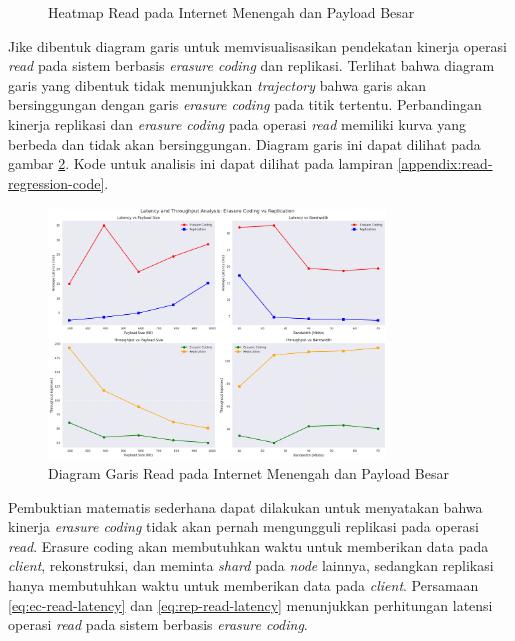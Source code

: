 \begin{enumerate}
\begin{figure}[ht]
    \caption{Heatmap Read pada Internet Menengah dan Payload Besar}
      \label{fig:read-bigload-avgnet-heatmap}
  \end{figure}

  Jike dibentuk diagram garis untuk memvisualisasikan pendekatan kinerja operasi \textit{read} pada sistem berbasis \textit{erasure coding} dan replikasi. Terlihat bahwa diagram garis yang dibentuk tidak menunjukkan \textit{trajectory} bahwa garis akan bersinggungan dengan garis \textit{erasure coding} pada titik tertentu. Perbandingan kinerja replikasi dan \textit{erasure coding} pada operasi \textit{read} memiliki kurva yang berbeda dan tidak akan bersinggungan. Diagram garis ini dapat dilihat pada gambar \ref{fig:read-bigload-avgnet-line}. Kode untuk analisis ini dapat dilihat pada lampiran \ref{appendix:read-regression-code}.

  \begin{figure}[ht]
    \centering
    \includegraphics[width=0.8\textwidth]{resources/chapter-4/read_bigload_avgnet_line.png}

    \caption{Diagram Garis Read pada Internet Menengah dan Payload Besar}
    \label{fig:read-bigload-avgnet-line}
  \end{figure}

  Pembuktian matematis sederhana dapat dilakukan untuk menyatakan bahwa kinerja \textit{erasure coding} tidak akan pernah mengungguli replikasi pada operasi \textit{read}. Erasure coding akan membutuhkan waktu untuk memberikan data pada \textit{client}, rekonstruksi, dan meminta \textit{shard} pada \textit{node} lainnya, sedangkan replikasi hanya membutuhkan waktu untuk memberikan data pada \textit{client}. Persamaan \ref{eq:ec-read-latency} dan \ref{eq:rep-read-latency} menunjukkan perhitungan latensi operasi \textit{read} pada sistem berbasis \textit{erasure coding}.


\end{enumerate}
